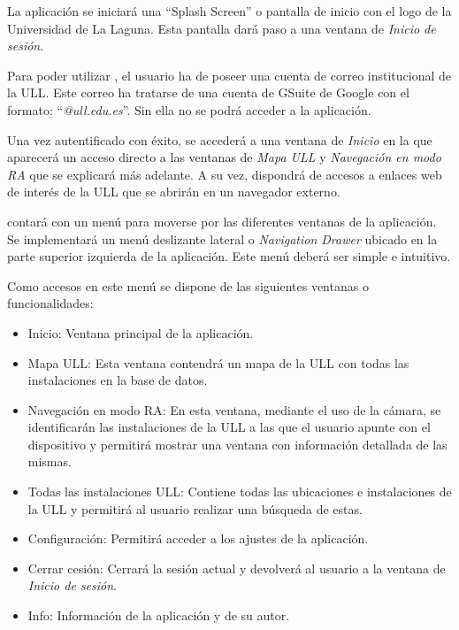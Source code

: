 La aplicación se iniciará una ``Splash Screen'' \cite{URL::SplashScreen} o pantalla de inicio con el logo de la Universidad de La Laguna. Esta pantalla dará paso a una ventana de \textit{Inicio de sesión}.

Para poder utilizar \ULLAR{}, el usuario ha de poseer una cuenta de correo institucional de la ULL. Este correo ha tratarse de una cuenta de GSuite \cite{URL::gsuite} de Google con el formato: ``\textit{@ull.edu.es}''. Sin ella no se podrá acceder a la aplicación.

Una vez autentificado con éxito, se accederá a una ventana de \textit{Inicio} en la que aparecerá un acceso directo a las ventanas de \textit{Mapa ULL} y \textit{Navegación en modo RA} que se  explicará más adelante. A su vez, dispondrá de accesos a enlaces web de interés de la ULL que se abrirán en un navegador externo. 

\ULLAR{} contará con un menú para moverse por las diferentes ventanas de la aplicación. Se implementará un menú deslizante lateral o \textit{Navigation Drawer} \cite{URL::NavigationDraw} ubicado en la parte superior izquierda de la aplicación. Este menú deberá ser simple e intuitivo.

Como accesos en este menú se dispone de las siguientes ventanas o funcionalidades:

\begin{itemize}
    \item Inicio: Ventana principal de la aplicación.
    \item Mapa ULL: Esta ventana contendrá un mapa de la ULL con todas las instalaciones en la base de datos.
    \item Navegación en modo RA: En esta ventana, mediante el uso de la cámara, se identificarán las instalaciones de la ULL a las que el usuario apunte con el dispositivo y permitirá mostrar una ventana con información detallada de las mismas.
    \item Todas las instalaciones ULL: Contiene todas las ubicaciones e instalaciones de la ULL y permitirá al usuario realizar una búsqueda de estas. 
    \item Configuración: Permitirá acceder a los ajustes de la aplicación.
    \item Cerrar cesión: Cerrará la sesión actual y devolverá al usuario a la ventana de \textit{Inicio de sesión}.
    \item Info: Información de la aplicación y de su autor.
\end{itemize}

